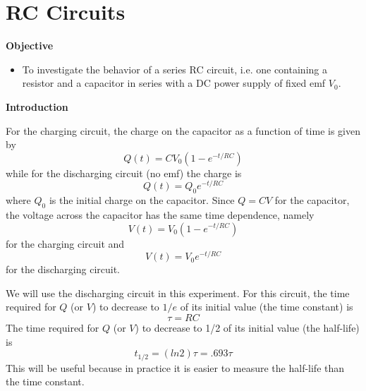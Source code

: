 \section{RC Circuits}
\begin{comment}
This is an old version of an RC circuits lab.  This version is superceded by the new lab, written by Matt Trawick in 2015.  
\end{comment}

\makelabheader %

\textbf{Objective}

\begin{itemize}
\item To investigate the behavior of a series RC circuit, i.e. one containing a resistor and a capacitor in series with a DC power supply of fixed emf $V_{0}$.
\end{itemize}
\textbf{Introduction} 

For the charging circuit, the charge on the capacitor as a function of time
is given by
\begin{equation}
Q(t)=CV_{0}\left(1-e^{-t/RC}\right)
\end{equation}
while for the discharging circuit (no emf) the charge is
\begin{equation}
Q(t)=Q_{0}e^{-t/RC}
\end{equation}
where $Q_{0}$ is the initial charge on the capacitor.  Since $Q=CV$ for the
capacitor, the voltage across the capacitor has the same time dependence,
namely
\begin{equation}
V(t)=V_{0}\left(1-e^{-t/RC}\right)
\end{equation}
for the charging circuit and
\begin{equation}
V(t)=V_{0}e^{-t/RC}
\end{equation}
for the discharging circuit.
\vspace{5mm}

We will use the discharging circuit in this experiment.
For this circuit, the time required for $Q$ (or $V$) to decrease to
$1/e$ of its initial value (the time constant) is
\begin{equation}
\tau=RC
\end{equation}
The time required for $Q$ (or $V$) to decrease to 1/2 of its initial value (the
half-life) is
\begin{equation}
t_{1/2}=(ln2)\tau =.693\tau
\end{equation}
This will be useful because in practice it is easier to measure the half-life
than the time constant.


